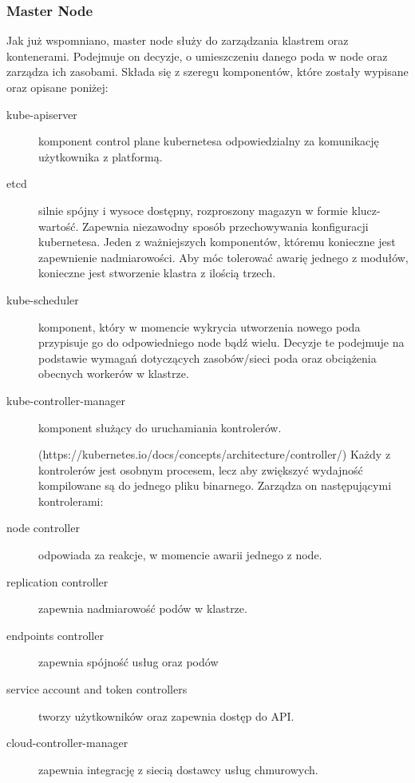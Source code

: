 \documentclass[pl,final,oneside]{mgr} %
\begin{document}
\subsubsection{Master Node}
Jak już wspomniano, master node służy do zarządzania klastrem oraz kontenerami. Podejmuje on decyzje, o umieszczeniu danego poda w node oraz zarządza ich zasobami. Składa się z szeregu komponentów, które zostały wypisane oraz opisane poniżej:
\begin{description}
	\item [kube-apiserver] komponent control plane kubernetesa odpowiedzialny za komunikację użytkownika z platformą. 
	\item [etcd] silnie spójny i wysoce dostępny, rozproszony magazyn w formie klucz-wartość. Zapewnia niezawodny sposób przechowywania konfiguracji kubernetesa. Jeden z ważniejszych komponentów, któremu konieczne jest zapewnienie nadmiarowości. Aby móc tolerować awarię jednego z modułów, konieczne jest stworzenie klastra z ilością trzech.
	\item [kube-scheduler] komponent, który w momencie wykrycia utworzenia nowego poda przypisuje go do odpowiedniego node bądź wielu. Decyzje te podejmuje na podstawie wymagań dotyczących zasobów/sieci poda oraz obciążenia obecnych workerów w klastrze. 
	\item [kube-controller-manager] komponent służący do uruchamiania kontrolerów.
	
	(https://kubernetes.io/docs/concepts/architecture/controller/) Każdy z kontrolerów jest osobnym procesem, lecz aby zwiększyć wydajność kompilowane są do jednego pliku binarnego. Zarządza on następującymi kontrolerami:
	\item [node controller] odpowiada za reakcje, w momencie awarii jednego z node.
	\item [replication controller] zapewnia nadmiarowość podów w klastrze.
	\item [endpoints controller] zapewnia spójność usług oraz podów
	\item [service account and token controllers] tworzy użytkowników oraz zapewnia dostęp do API.
	\item [cloud-controller-manager] zapewnia integrację z siecią dostawcy usług chmurowych. 
\end{description}
\end{document}
